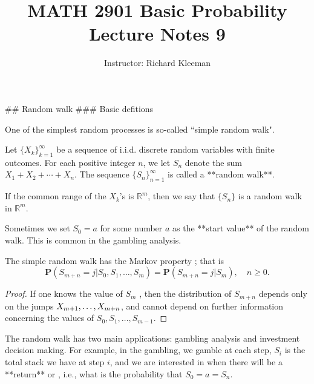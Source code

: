 


\title{MATH 2901 Basic Probability Lecture Notes 9}
\author{Instructor: Richard Kleeman}
\date{}
\maketitle


## Random walk
### Basic defitions

One of the simplest random processes is so-called ``simple 
random walk". 

\begin{definition}
Let $\{X_k\}_{k=1}^\infty$ be a sequence of i.i.d. discrete random variables with finite outcomes. For each positive integer $n$, we let $S_n$ denote the sum $X_1 +X_2 + \cdots + X_n$. The sequence $\{S_n\}_{n=1}^\infty$ is called a **random walk**.
\end{definition}

\begin{remark}
If the common range of the $X_k$’s is $\mathbb{R}^m$, then we say that $\{S_n\}$ is a random walk in $\mathbb{R}^m$.
\end{remark}

\begin{remark}
Sometimes we set $S_0 = a$ for some number $a$ as the **start value** of the random walk. This is common in the gambling analysis.
\end{remark}

\begin{lemma}
The simple random walk has the Markov property ; that is
\begin{equation*}
    \mathbf{P}\left(S_{m+n}=j | S_{0}, S_{1}, \ldots, S_{m}\right)=\mathbf{P}\left(S_{m+n}=j | S_{m}\right), \quad n \geq 0.
\end{equation*}
\end{lemma}

\begin{proof}
If one knows the value of $S_m$ , then the distribution of $S_{m+n}$ depends only on the jumps $X_{m+ 1} ,\dots, \\ X_{m+n}$, and cannot depend on further information concerning the values of $S_0, S_1, \dots , S_{m-1}$.
\end{proof}

The random walk has two main applications: gambling analysis and investment decision making. For example, in the gambling, we gamble at each step, $S_i$ is the total stack we have at step $i$, and we are interested in when there will be a **return** or , i.e., what is the probability that $S_0 = a = S_n$.

